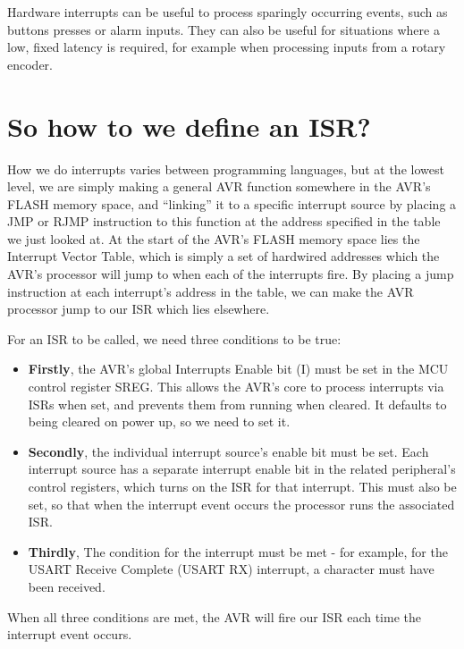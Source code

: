\documentclass[a4paper,oneside,notitlepage]{book}
\begin{document}
Hardware interrupts can be useful to process sparingly occurring events, such as buttons presses or alarm inputs. They can also be useful for situations where a low, fixed latency is required, for example when processing inputs from a rotary encoder.


\label{chp:DefISR}
\chapter{So how to we define an ISR?}

How we do interrupts varies between programming languages, but at the lowest level, we are simply making a general AVR function somewhere in the AVR's FLASH memory space, and ``linking'' it to a specific interrupt source by placing a JMP or RJMP instruction to this function at the address specified in the table we just looked at. At the start of the AVR's FLASH memory space lies the Interrupt Vector Table, which is simply a set of hardwired addresses which the AVR's processor will jump to when each of the interrupts fire. By placing a jump instruction at each interrupt's address in the table, we can make the AVR processor jump to our ISR which lies elsewhere.

For an ISR to be called, we need three conditions to be true: 

\begin{itemize}
\item \textbf{Firstly}, the AVR's global Interrupts Enable bit (I) must be set in the MCU control register SREG. This allows the AVR's core to process interrupts via ISRs when set, and prevents them from running when cleared. It defaults to being cleared on power up, so we need to set it.

\item \textbf{Secondly}, the individual interrupt source's enable bit must be set. Each interrupt source has a separate interrupt enable bit in the related peripheral's control registers, which turns on the ISR for that interrupt. This must also be set, so that when the interrupt event occurs the processor runs the associated ISR.

\item \textbf{Thirdly}, The condition for the interrupt must be met - for example, for the USART Receive Complete (USART RX) interrupt, a character must have been received. 
\end{itemize}

When all three conditions are met, the AVR will fire our ISR each time the interrupt event occurs.
\end{document}
